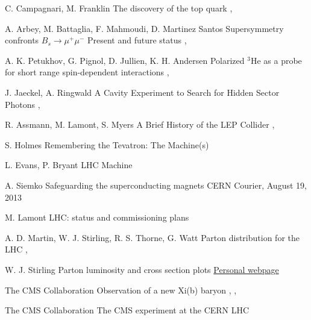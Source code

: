 {C. Campagnari, M. Franklin}
{The discovery of the top quark}
{, }

{A. Arbey, M. Battaglia, F. Mahmoudi, D. Martinez Santos}
{Supersymmetry confronts $B_s \rightarrow \mu^+ \mu^-$ Present and future status}
{, }

{A. K. Petukhov, G. Pignol, D. Jullien, K. H. Andersen}
{Polarized $^3$He as a probe for short range spin-dependent interactions}
{, }

{J. Jaeckel, A. Ringwald}
{A Cavity Experiment to Search for Hidden Sector Photons}
{, }

{R. Assmann, M. Lamont, S. Myers}
{A Brief History of the LEP Collider}
{, }

{S. Holmes}
{Remembering the Tevatron: The Machine(s)}
{}

{L. Evans, P. Bryant}
{LHC Machine}
{}

{A. Siemko}
{Safeguarding the superconducting magnets}
{CERN Courier, August 19, 2013}

{M. Lamont}
{LHC: status and commissioning plans}
{}

{A. D. Martin, W. J. Stirling, R. S. Thorne, G. Watt}
{Parton distribution for the LHC}
{, }

{W. J. Stirling}
{Parton luminosity and cross section plots}
{\href{http://www.hep.ph.ic.ac.uk/~wstirlin/plots/plots.html}{Personal webpage}}

{The CMS Collaboration}
{Observation of a new Xi(b) baryon}
{, , }

{The CMS Collaboration}
{The CMS experiment at the CERN LHC}
{}

